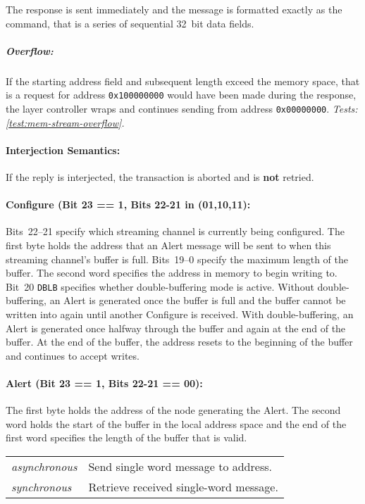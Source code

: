 The response is sent immediately and the message is formatted exactly as the
 command, that is a series of sequential 32~bit
data fields.

\subparagraph{Overflow:} If the starting address field and subsequent length
exceed the memory space, that is a request for address {\tt 0x100000000} would
have been made during the response, the layer controller wraps and continues
sending from address {\tt 0x00000000}.
{\em Tests: \ref{test:mem-stream-overflow}.}

\paragraph{Interjection Semantics:} If the reply is interjected, the
transaction is aborted and is {\bf not} retried.

\paragraph{Configure (Bit 23 == 1, Bits 22-21 in (01,10,11):}
\label{scratch:cmd:mem-stream-multi-conf}
Bits~22--21 specify which streaming channel is currently being configured.
The first byte holds the \bus address that an Alert message will be sent to
when this streaming channel's buffer is full.
Bits~19--0 specify the maximum length of the buffer.
The second word specifies the address in memory to begin writing to.
Bit~20 {\tt DBLB} specifies whether double-buffering mode is active. Without
double-buffering, an Alert is generated once the buffer is full and the buffer
cannot be written into again until another Configure is received. With
double-buffering, an Alert is generated once halfway through the buffer and
again at the end of the buffer. At the end of the buffer, the address resets
to the beginning of the buffer and continues to accept writes.

\paragraph{Alert (Bit 23 == 1, Bits 22-21 == 00):}
\label{scratch:cmd:mem-stream-multi-alert}
The first byte holds the address of the node generating the Alert.
The second word holds the start of the buffer in the local address space and
the end of the first word specifies the length of the buffer that is valid.



\begin{tabular}{l l}
  {\em asynchronous} & Send single word message to address. \\
  {\em  synchronous} & Retrieve received single-word message. \\
\end{tabular}

